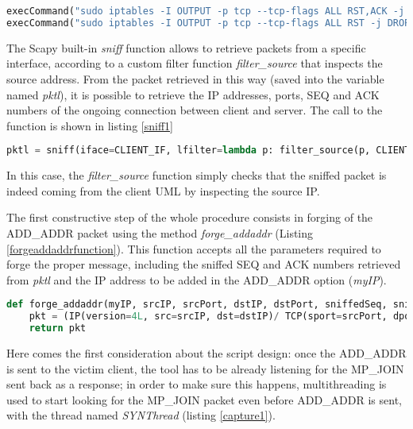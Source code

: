 \begin{lstlisting}[language=python, caption=\textit{Disable RST outgoing packets}, label=norst]
execCommand("sudo iptables -I OUTPUT -p tcp --tcp-flags ALL RST,ACK -j DROP", shell = True)
execCommand("sudo iptables -I OUTPUT -p tcp --tcp-flags ALL RST -j DROP", shell = True)
\end{lstlisting}

The Scapy built-in \textit{sniff} function allows to retrieve packets from a specific interface, according to a custom filter function \textit{filter\_source} that inspects the source address. From the packet retrieved in this way (saved into the variable named \textit{pktl}), it is possible to retrieve the IP addresses, ports, SEQ and ACK numbers of the ongoing connection between client and server. The call to the function is shown in listing \ref{sniff1}

\begin{lstlisting}[language=python, caption=\textit{Sniffing a first packet from the client}, label=sniff1]
pktl = sniff(iface=CLIENT_IF, lfilter=lambda p: filter_source(p, CLIENT_IP), count=1)
\end{lstlisting}

In this case, the \textit{filter\_source} function simply checks that the sniffed packet is indeed coming from the client UML by inspecting the source IP. 

The first constructive step of the whole procedure consists in forging of the ADD\_ADDR packet using the method \textit{forge\_addaddr} (Listing \ref{forgeaddaddrfunction}). This function accepts all the parameters required to forge the proper message, including the sniffed SEQ and ACK numbers retrieved from \textit{pktl} and the IP address to be added in the ADD\_ADDR option (\textit{myIP}).

\begin{lstlisting}[language=python, caption=\textit{forge\_addaddr method}, label=forgeaddaddrfunction] 
def forge_addaddr(myIP, srcIP, srcPort, dstIP, dstPort, sniffedSeq, sniffedAck):
    pkt = (IP(version=4L, src=srcIP, dst=dstIP)/ TCP(sport=srcPort, dport=dstPort, flags="A", seq=sniffedSeq, ack=sniffedAck, options=[TCPOption_MP(mptcp=MPTCP_AddAddr(address_id=ADDRESS_ID, adv_addr=myIP))]))
    return pkt
\end{lstlisting}

Here comes the first consideration about the script design: once the ADD\_ADDR is sent to the victim client, the tool has to be already listening for the MP\_JOIN sent back as a response; in order to make sure this happens, multithreading is used to start looking for the MP\_JOIN packet even before ADD\_ADDR is sent, with the thread named \textit{SYNThread} (listing \ref{capture1}). 


